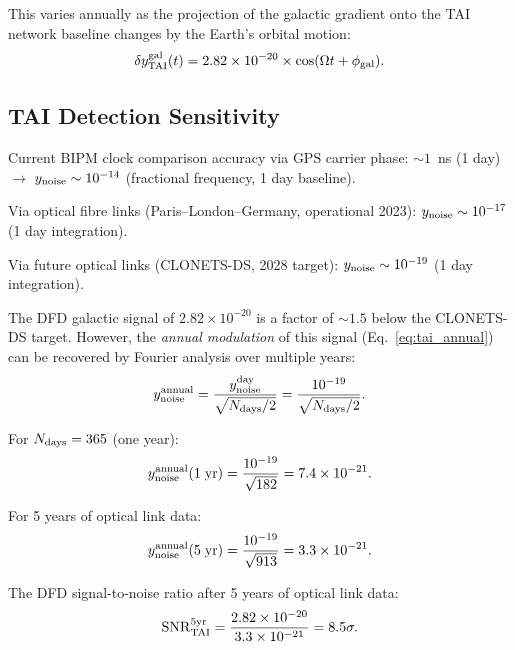 \documentclass[aps,prd,twocolumn,superscriptaddress,nofootinbib]{revtex4-2}
\begin{document}
This varies annually as the projection of the galactic gradient onto the
TAI network baseline changes by the Earth's orbital motion:
\begin{equation}
\delta y^{\rm gal}_{\rm TAI}(t)
= 2.82\times10^{-20}\times\cos(\Omega t + \phi_{\rm gal}).
\label{eq:tai_annual}
\end{equation}

\subsection{TAI Detection Sensitivity}

Current BIPM clock comparison accuracy via GPS carrier phase:
$\sim 1$~ns (1 day) $\to$ $y_{\rm noise} \sim 10^{-14}$ (fractional frequency,
1 day baseline).

Via optical fibre links (Paris--London--Germany, operational 2023):
$y_{\rm noise} \sim 10^{-17}$ (1 day integration).

Via future optical links (CLONETS-DS, 2028 target):
$y_{\rm noise} \sim 10^{-19}$ (1 day integration).

The DFD galactic signal of $2.82\times10^{-20}$ is a factor of
$\sim 1.5$ below the CLONETS-DS target. However, the \emph{annual modulation}
of this signal (Eq.~\ref{eq:tai_annual}) can be recovered by Fourier
analysis over multiple years:
\begin{equation}
y_{\rm noise}^{\rm annual} = \frac{y_{\rm noise}^{\rm day}}{\sqrt{N_{\rm days}/2}}
= \frac{10^{-19}}{\sqrt{N_{\rm days}/2}}.
\end{equation}

For $N_{\rm days} = 365$ (one year):
\begin{equation}
y_{\rm noise}^{\rm annual}(1\;\text{yr})
= \frac{10^{-19}}{\sqrt{182}} = 7.4\times10^{-21}.
\end{equation}

For 5 years of optical link data:
\begin{equation}
y_{\rm noise}^{\rm annual}(5\;\text{yr})
= \frac{10^{-19}}{\sqrt{913}} = 3.3\times10^{-21}.
\end{equation}

The DFD signal-to-noise ratio after 5 years of optical link data:
\begin{equation}
{\rm SNR}_{\rm TAI}^{5\rm yr}
= \frac{2.82\times10^{-20}}{3.3\times10^{-21}} = 8.5\sigma.
\end{equation}
\end{document}
